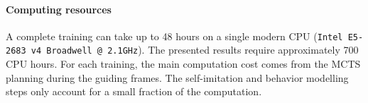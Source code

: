 \paragraph{Computing resources}

A complete \abig training can take up to 48 hours on a single modern CPU (\texttt{Intel E5-2683 v4 Broadwell @ 2.1GHz}). The presented results require approximately 700 CPU hours. For each training, the main computation cost comes from the MCTS planning during the guiding frames. The self-imitation and behavior modelling steps only account for a small fraction of the computation. 

